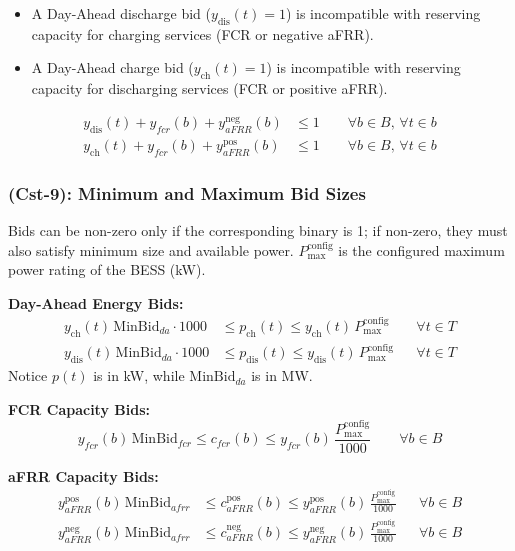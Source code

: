 \documentclass[11pt, a4paper]{article}
\begin{document}
\begin{itemize}
  \item A Day-Ahead discharge bid ($y_{\mathrm{dis}}(t)=1$) is incompatible with reserving capacity for charging services (FCR or negative aFRR).
  \item A Day-Ahead charge bid ($y_{\mathrm{ch}}(t)=1$) is incompatible with reserving capacity for discharging services (FCR or positive aFRR).
\end{itemize}

\begin{align}
    y_{\mathrm{dis}}(t) + y_{fcr}(b) + y^{\mathrm{neg}}_{aFRR}(b) &\le 1 \qquad \forall b\in B,\, \forall t\in b \\
    y_{\mathrm{ch}}(t) + y_{fcr}(b) + y^{\mathrm{pos}}_{aFRR}(b) &\le 1 \qquad \forall b\in B,\, \forall t\in b
\end{align}

\subsubsection*{(Cst-9): Minimum and Maximum Bid Sizes}
Bids can be non-zero only if the corresponding binary is 1; if non-zero, they must also satisfy minimum size and available power. $P^{\mathrm{config}}_{\max}$ is the configured maximum power rating of the BESS (kW).

\textbf{Day-Ahead Energy Bids:}
\begin{align}
    y_{\mathrm{ch}}(t)\,\text{MinBid}_{da} \cdot 1000 &\le p_{\mathrm{ch}}(t) \le y_{\mathrm{ch}}(t)\,P^{\mathrm{config}}_{\max} && \forall t\in T \\
    y_{\mathrm{dis}}(t)\,\text{MinBid}_{da} \cdot 1000 &\le p_{\mathrm{dis}}(t) \le y_{\mathrm{dis}}(t)\,P^{\mathrm{config}}_{\max} && \forall t\in T
\end{align}
Notice $p(t)$ is in kW, while $\text{MinBid}_{da}$ is in MW.

\textbf{FCR Capacity Bids:}
\begin{equation}
    y_{fcr}(b)\,\text{MinBid}_{fcr} \le c_{fcr}(b) \le y_{fcr}(b)\,\frac{P^{\mathrm{config}}_{\max}}{1000} \qquad \forall b\in B
\end{equation}

\textbf{aFRR Capacity Bids:}
\begin{align}
    y^{\mathrm{pos}}_{aFRR}(b)\,\text{MinBid}_{afrr} &\le c^{\mathrm{pos}}_{aFRR}(b) \le y^{\mathrm{pos}}_{aFRR}(b)\,\frac{P^{\mathrm{config}}_{\max}}{1000} && \forall b\in B \\
    y^{\mathrm{neg}}_{aFRR}(b)\,\text{MinBid}_{afrr} &\le c^{\mathrm{neg}}_{aFRR}(b) \le y^{\mathrm{neg}}_{aFRR}(b)\,\frac{P^{\mathrm{config}}_{\max}}{1000} && \forall b\in B
\end{align}
\end{document}
